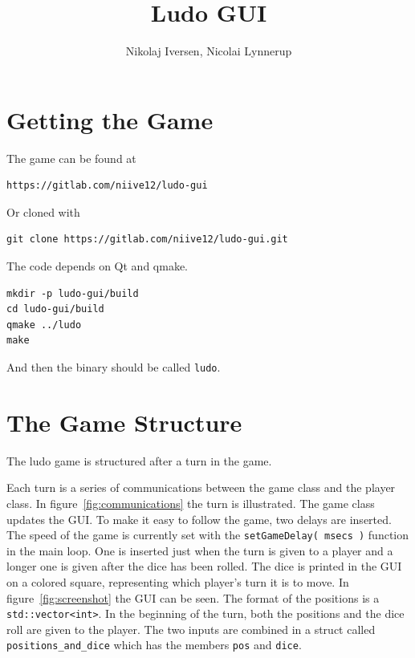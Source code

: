 \documentclass[a4paper,10pt]{article}
\title{Ludo GUI}
\author{Nikolaj Iversen, Nicolai Lynnerup}
\begin{document}
\maketitle

\section{Getting the Game}
The game can be found at
\begin{verbatim}
https://gitlab.com/niive12/ludo-gui
\end{verbatim}
Or cloned with
\begin{verbatim}
git clone https://gitlab.com/niive12/ludo-gui.git
\end{verbatim}
The code depends on Qt and qmake.
\begin{verbatim}
mkdir -p ludo-gui/build
cd ludo-gui/build
qmake ../ludo
make
\end{verbatim}
And then the binary should be called \verb|ludo|.

\section{The Game Structure}
The ludo game is structured after a turn in the game.

Each turn is a series of communications between the game class and the player class.
In figure~\ref{fig:communications} the turn is illustrated.
The game class updates the GUI.
To make it easy to follow the game, two delays are inserted.
The speed of the game is currently set with the \verb|setGameDelay( msecs )| function in the main loop.
One is inserted just when the turn is given to a player and a longer one is given after the dice has been rolled.
The dice is printed in the GUI on a colored square, representing which player's turn it is to move.
In figure~\ref{fig:screenshot} the GUI can be seen.
The format of the positions is a \verb+std::vector<int>+.
In the beginning of the turn, both the positions and the dice roll are given to the player.
The two inputs are combined in a struct called \verb|positions_and_dice| which has the members \verb|pos| and \verb|dice|.
\end{document}
